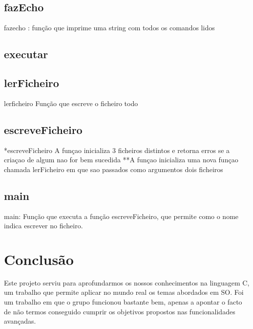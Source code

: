 \documentclass[a4paper]{article}
\begin{document}
\subsection{fazEcho}
fazecho : função que imprime uma string com todos os comandos lidos


\subsection{executar}




\subsection{lerFicheiro}
lerficheiro
Função que escreve o ficheiro todo

\subsection{escreveFicheiro}
*escreveFicheiro
A funçao inicializa 3 ficheiros distintos e retorna erros se a criaçao de algum nao for bem sucedida
**A funçao inicializa uma nova funçao chamada lerFicheiro em que sao passados como argumentos dois ficheiros

\subsection{main}
main:
Função que executa a função escreveFicheiro, que permite como o nome indica escrever no ficheiro.

\section{Conclusão}
\label{sec:conclusao}
Este projeto serviu para aprofundarmos os nossos conhecimentos na linguagem C, um trabalho que permite aplicar no mundo real os temas abordados em SO.
Foi um trabalho em que o grupo funcionou bastante bem, apenas a apontar o facto de não termos conseguido cumprir os objetivos propostos nas funcionalidades avançadas.
\end{document}
